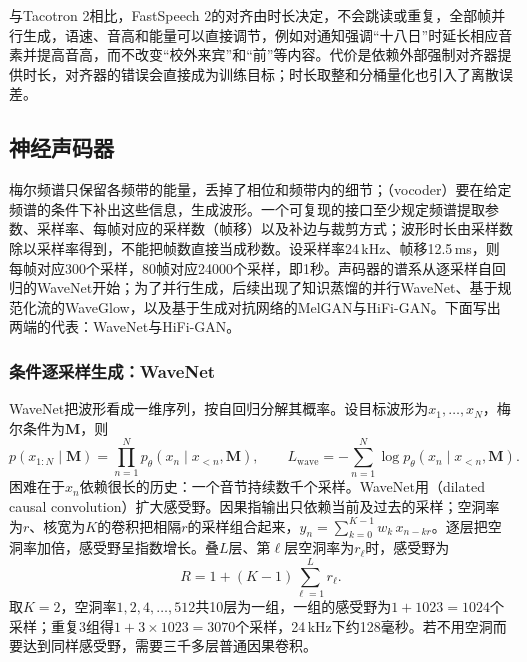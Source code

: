 与Tacotron 2相比，FastSpeech 2的对齐由时长决定，不会跳读或重复，全部帧并行生成，语速、音高和能量可以直接调节，例如对通知强调“十八日”时延长相应音素并提高音高，而不改变“校外来宾”和“前”等内容。代价是依赖外部强制对齐器提供时长，对齐器的错误会直接成为训练目标；时长取整和分桶量化也引入了离散误差。

\subsection{神经声码器}
\label{sec:nlp-speech-waveform}

梅尔频谱只保留各频带的能量，丢掉了相位和频带内的细节；（vocoder）要在给定频谱的条件下补出这些信息，生成波形。一个可复现的接口至少规定频谱提取参数、采样率、每帧对应的采样数（帧移）以及补边与裁剪方式；波形时长由采样数除以采样率得到，不能把帧数直接当成秒数。设采样率24\,kHz、帧移12.5\,ms，则每帧对应300个采样，80帧对应24000个采样，即1秒。声码器的谱系从逐采样自回归的WaveNet开始；为了并行生成，后续出现了知识蒸馏的并行WaveNet、基于规范化流的WaveGlow，以及基于生成对抗网络的MelGAN与HiFi-GAN。下面写出两端的代表：WaveNet与HiFi-GAN。

\subsubsection{条件逐采样生成：WaveNet}
\label{sec:nlp-speech-wavenet}

WaveNet把波形看成一维序列，按自回归分解其概率。设目标波形为$x_1,\ldots,x_N$，梅尔条件为$\bm{M}$，则
\begin{equation}
 p(x_{1:N}\mid\bm{M})
   =\prod_{n=1}^{N}p_\theta(x_n\mid x_{<n},\bm{M}),
 \qquad
 L_{\mathrm{wave}}=-\sum_{n=1}^{N}
       \log p_\theta(x_n\mid x_{<n},\bm{M}).
 \label{eq:nlp-speech-wavenet}
\end{equation}
困难在于$x_n$依赖很长的历史：一个音节持续数千个采样。WaveNet用（dilated causal convolution）扩大感受野。因果指输出只依赖当前及过去的采样；空洞率为$r$、核宽为$K$的卷积把相隔$r$的采样组合起来，$y_n=\sum_{k=0}^{K-1}w_k\,x_{n-kr}$。逐层把空洞率加倍，感受野呈指数增长。叠$L$层、第$\ell$层空洞率为$r_\ell$时，感受野为
\begin{equation}
  R=1+(K-1)\sum_{\ell=1}^{L}r_\ell .
  \label{eq:nlp-speech-receptive-field}
\end{equation}
取$K=2$，空洞率$1,2,4,\ldots,512$共10层为一组，一组的感受野为$1+1023=1024$个采样；重复3组得$1+3\times1023=3070$个采样，24\,kHz下约128毫秒。若不用空洞而要达到同样感受野，需要三千多层普通因果卷积。

